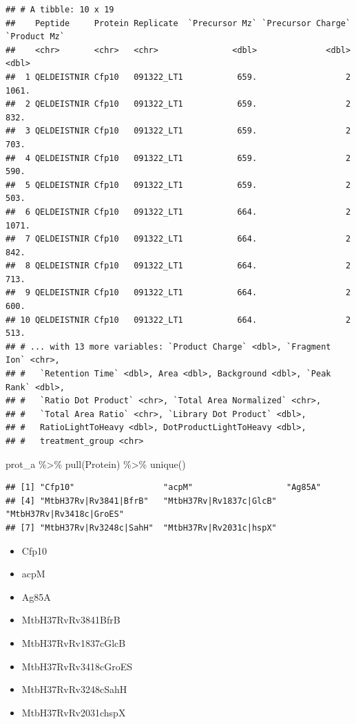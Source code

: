 \documentclass[
]{book}
\newenvironment{Shaded}{\begin{snugshade}}{\end{snugshade}}
\newcommand{\FunctionTok}[1]{\textcolor[rgb]{0.00,0.00,0.00}{#1}}
\newcommand{\NormalTok}[1]{#1}
\newcommand{\SpecialCharTok}[1]{\textcolor[rgb]{0.00,0.00,0.00}{#1}}
\providecommand{\tightlist}{%
  \setlength{\itemsep}{0pt}\setlength{\parskip}{0pt}}
\begin{document}
\begin{verbatim}
## # A tibble: 10 x 19
##    Peptide     Protein Replicate  `Precursor Mz` `Precursor Charge` `Product Mz`
##    <chr>       <chr>   <chr>               <dbl>              <dbl>        <dbl>
##  1 QELDEISTNIR Cfp10   091322_LT1           659.                  2        1061.
##  2 QELDEISTNIR Cfp10   091322_LT1           659.                  2         832.
##  3 QELDEISTNIR Cfp10   091322_LT1           659.                  2         703.
##  4 QELDEISTNIR Cfp10   091322_LT1           659.                  2         590.
##  5 QELDEISTNIR Cfp10   091322_LT1           659.                  2         503.
##  6 QELDEISTNIR Cfp10   091322_LT1           664.                  2        1071.
##  7 QELDEISTNIR Cfp10   091322_LT1           664.                  2         842.
##  8 QELDEISTNIR Cfp10   091322_LT1           664.                  2         713.
##  9 QELDEISTNIR Cfp10   091322_LT1           664.                  2         600.
## 10 QELDEISTNIR Cfp10   091322_LT1           664.                  2         513.
## # ... with 13 more variables: `Product Charge` <dbl>, `Fragment Ion` <chr>,
## #   `Retention Time` <dbl>, Area <dbl>, Background <dbl>, `Peak Rank` <dbl>,
## #   `Ratio Dot Product` <chr>, `Total Area Normalized` <chr>,
## #   `Total Area Ratio` <chr>, `Library Dot Product` <dbl>,
## #   RatioLightToHeavy <dbl>, DotProductLightToHeavy <dbl>,
## #   treatment_group <chr>
\end{verbatim}

\begin{Shaded}
\begin{Highlighting}[]
\NormalTok{prot\_a }\SpecialCharTok{\%\textgreater{}\%} 
  \FunctionTok{pull}\NormalTok{(Protein) }\SpecialCharTok{\%\textgreater{}\%} 
  \FunctionTok{unique}\NormalTok{()}
\end{Highlighting}
\end{Shaded}

\begin{verbatim}
## [1] "Cfp10"                  "acpM"                   "Ag85A"                 
## [4] "MtbH37Rv|Rv3841|BfrB"   "MtbH37Rv|Rv1837c|GlcB"  "MtbH37Rv|Rv3418c|GroES"
## [7] "MtbH37Rv|Rv3248c|SahH"  "MtbH37Rv|Rv2031c|hspX"
\end{verbatim}

\begin{itemize}
\tightlist
\item
  Cfp10
\item
  acpM
\item
  Ag85A
\item
  MtbH37Rv\textbar Rv3841\textbar BfrB
\item
  MtbH37Rv\textbar Rv1837c\textbar GlcB
\item
  MtbH37Rv\textbar Rv3418c\textbar GroES
\item
  MtbH37Rv\textbar Rv3248c\textbar SahH
\item
  MtbH37Rv\textbar Rv2031c\textbar hspX
\end{itemize}
\end{document}
